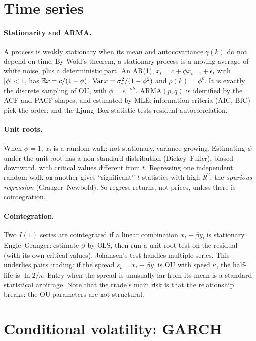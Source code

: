 \section{Time series}

\paragraph{Stationarity and ARMA.} A process is weakly stationary when its mean and autocovariance $\gamma(k)$ do not depend on time. By Wold's theorem, a stationary process is a moving average of white noise, plus a deterministic part. An AR(1), $x_t=c+\phi x_{t-1}+\epsilon_t$ with $|\phi|<1$, has $\mathbb{E} x=c/(1-\phi)$, $\operatorname{Var} x=\sigma_\epsilon^2/(1-\phi^2)$ and $\rho(k)=\phi^k$. It is exactly the discrete sampling of OU, with $\phi=e^{-\kappa h}$. ARMA$(p,q)$ is identified by the ACF and PACF shapes, and estimated by MLE; information criteria (AIC, BIC) pick the order; and the Ljung--Box statistic tests residual autocorrelation.

\paragraph{Unit roots.} When $\phi=1$, $x_t$ is a random walk: not stationary, variance growing. Estimating $\phi$ under the unit root has a non-standard distribution (Dickey--Fuller), biased downward, with critical values different from $t$. Regressing one independent random walk on another gives ``significant'' $t$-statistics with high $R^2$: the \emph{spurious regression} (Granger--Newbold). So regress returns, not prices, unless there is cointegration.

\paragraph{Cointegration.} Two $I(1)$ series are cointegrated if a linear combination $x_t-\beta y_t$ is stationary. Engle--Granger: estimate $\beta$ by OLS, then run a unit-root test on the residual (with its own critical values). Johansen's test handles multiple series. This underlies pairs trading: if the spread $s_t=x_t-\beta y_t$ is OU with speed $\kappa$, the half-life is $\ln2/\kappa$. Entry when the spread is unusually far from its mean is a standard statistical arbitrage. Note that the trade's main risk is that the relationship breaks: the OU parameters are not structural.

\section{Conditional volatility: GARCH}

